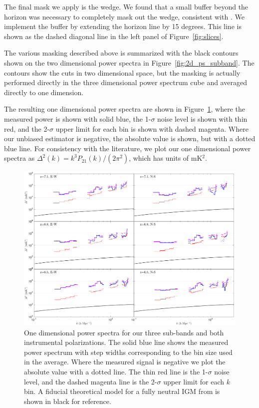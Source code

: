\documentclass[iop]{emulateapj}
\begin{document}
The final mask we apply is the wedge. We found that a small buffer beyond the horizon was
necessary to completely mask out the wedge, consistent with \citealt{Dillon:2015}. We
implement the buffer by extending the horizon line by 15 degrees. This line is shown as the
dashed diagonal line in the left panel of Figure~\ref{fig:slices}.

The various masking described above is summarized with the black contours shown on the
two dimensional power spectra in Figure~\ref{fig:2d_ps_subband}. The contours show
the cuts in two dimensional space, but the masking is actually performed directly in the
three dimensional power spectrum cube and averaged directly to one dimension.

The resulting one dimensional power spectra are shown in Figure~\ref{fig:1d_ps}, where 
the measured power is shown with solid blue, the 1-$\sigma$ noise level is shown with 
thin red, and the 2-$\sigma$ upper limit for each bin is shown with dashed magenta. 
Where our unbiased estimator is negative, the absolute value is shown, but with a dotted 
blue line. For consistency with the literature, we plot our one dimensional power spectra 
as $\Delta^2(k)=k^3P_{21}(k)/(2\pi^2)$, which has units of mK$^2$.

\begin{figure}
\begin{center}
\includegraphics[width=\textwidth]{1D_spectra.pdf}
\caption[1D deep power spectra]{
One dimensional power spectra for our three sub-bands and both instrumental 
polarizations. The solid blue line shows the measured power spectrum with step widths 
corresponding to the bin size used in the average. Where the measured signal is negative 
we plot the absolute value with a dotted line. The thin red line is the 1-$\sigma$ noise level, and 
the dashed magenta line is the 2-$\sigma$ upper limit for each $k$ bin. 
A fiducial theoretical model for a fully neutral IGM from \citet{Furlanetto:2006} is shown
in black for reference.
\label{fig:1d_ps}
}
\end{center}
\end{figure}
\end{document}
